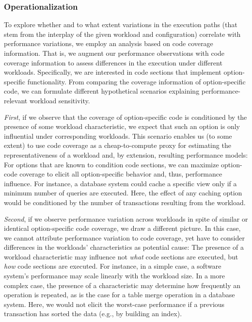{{{\subsubsection{Operationalization}To explore whether and to what extent variations in the execution paths (that stem from the interplay of the given workload and configuration) correlate with performance variations, we employ an analysis based on code coverage information. That is, we augment our performance observations with code coverage information to assess differences in the execution under different workloads. Specifically, we are interested in code sections that implement option-specific functionality. From comparing the coverage information of option-specific code, we can formulate different hypothetical scenarios explaining performance-relevant workload sensitivity. 

\textit{First}, if we observe that the  coverage of option-specific code is conditioned by the presence of some workload characteristic, we expect that such an option is only influential under corresponding workloads. This scenario enables us (to some extent) to use code coverage as a cheap-to-compute proxy for estimating the representativeness of a workload and, by extension, resulting performance models: For options that are known to condition code sections, we can maximize option-code coverage to elicit all option-specific behavior and, thus, performance influence. For instance, a database system could cache a specific view only if a minimum number of queries are executed. Here, the effect of any caching option would be conditioned by the number of transactions resulting from the workload.

\textit{Second}, if we observe performance variation across workloads in spite of similar or identical option-specific code coverage, we draw a different picture. In this case, we cannot attribute performance variation to code coverage, yet have to consider differences in the workloads’ characteristics as potential cause: The presence of a workload characteristic may influence not  \emph{what} code sections are executed, but \emph{how} code sections are executed. For instance, in a simple case, a software system’s performance may scale linearly with the workload size. In a more complex case, the presence of a characteristic may determine how frequently an operation is repeated, as is the case for a table merge operation in a database system. Here, we would not elicit the worst-case performance if a previous transaction has sorted the data (e.g., by building an index).

}}}
